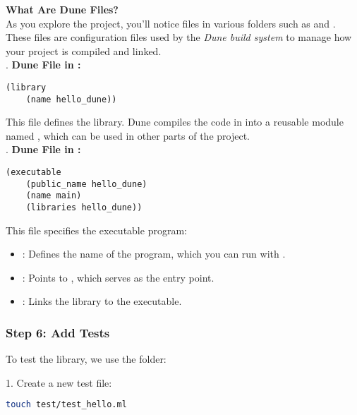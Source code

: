 \vspace{1em}
\noindent
\textbf{What Are Dune Files?}\\
As you explore the project, you’ll notice  files in various folders such as  and . These files 
are configuration files used by the \textit{Dune build system} to manage how your project is compiled and linked.\\

. \textbf{Dune File in :}
   \begin{lstlisting}[language=PlainText, caption={Library Dune File}]
   (library
    (name hello_dune))
   \end{lstlisting}

   \noindent This file defines the  library. Dune compiles the code in  into a reusable 
   module named , which can be used in other parts of the project.\\

. \textbf{Dune File in :}
   \begin{lstlisting}[language=PlainText, caption={Executable Dune File}]
   (executable
    (public_name hello_dune)
    (name main)
    (libraries hello_dune))
   \end{lstlisting}

   \noindent This file specifies the executable program:
   \begin{itemize}
       \item {}: Defines the name of the program, which you can run with .
       \item {}: Points to , which serves as the entry point.
       \item {}: Links the  library to the executable.
   \end{itemize}

\noindent

\newpage

\subsubsection{Step 6: Add Tests}

To test the library, we use the  folder:

1. Create a new test file:
\begin{lstlisting}[language=Bash]
   touch test/test_hello.ml
   \end{lstlisting}

